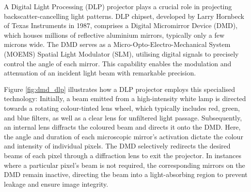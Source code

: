 A Digital Light Processing (DLP) projector plays a crucial role in projecting backscatter-cancelling light patterns. DLP chipset, developed by Larry Hornbeck of Texas Instruments in 1987, comprises a Digital Micromirror Device (DMD), which houses millions of reflective aluminium mirrors, typically only a few microns wide. The DMD serves as a Micro-Opto-Electro-Mechanical System (MOEMS) Spatial Light Modulator (SLM), utilising digital signals to precisely control the angle of each mirror. This capability enables the modulation and attenuation of an incident light beam with remarkable precision. 

Figure \ref{fig:dmd_dlp} illustrates how a DLP projector employs this specialised technology: Initially, a beam emitted from a high-intensity white lamp is directed towards a rotating colour-tinted lens wheel, which typically includes red, green, and blue filters, as well as a clear lens for unfiltered light passage. Subsequently, an internal lens diffracts the coloured beam and directs it onto the DMD. Here, the angle and duration of each microscopic mirror's activation dictate the colour and intensity of individual pixels. The DMD selectively redirects the desired beams of each pixel through a diffraction lens to exit the projector. In instances where a particular pixel's beam is not required, the corresponding mirrors on the DMD remain inactive, directing the beam into a light-absorbing region to prevent leakage and ensure image integrity.


